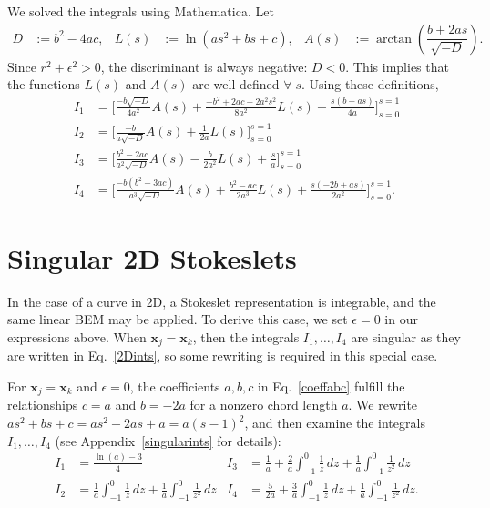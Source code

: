 \documentclass[12pt]{article}
\newcommand{\bx}{\mathbf{x}}
\newcommand{\eps}{\epsilon}
\newcommand{\baa}[1]{\begin{align} #1 \end{align}}
\newcommand{\baas}[1]{\begin{align*} #1 \end{align*}}
\begin{document}
	We solved the integrals using Mathematica. Let
	\baa{
	D & := b^2 - 4ac, & L(s) & :=  \ln \left( as^2 + bs + c \right), & A(s) & := \arctan\left(\dfrac{b + 2as}{\sqrt{-D}}\right). \nonumber
	}
	Since $r^2 + \eps^2 > 0$, the discriminant is always negative: $D < 0$. This implies that the functions $L(s)$ and $A(s)$ are well-defined $\forall \; s$. Using these definitions,
	\baa{
	I_1 & = \Bigg[\frac{-b\sqrt{-D}}{4a^2}A(s) + \frac{-b^2 + 2ac + 2a^2s^2}{8a^2}L(s) + \frac{s(b-as)}{4a} \Bigg]_{s=0}^{s=1} \nonumber \\
	I_2 & = \Bigg[\frac{-b}{a\sqrt{-D}}A(s) + \frac{1}{2a}L(s) \Bigg]_{s=0}^{s=1} \nonumber \\
	I_3 & = \Bigg[\frac{b^2 - 2ac}{a^2\sqrt{-D}}A(s) - \frac{b}{2a^2}L(s) + \frac{s}{a}\Bigg]_{s=0}^{s=1} \nonumber \\
	I_4 & = \Bigg[\frac{-b(b^2 - 3ac)}{a^3\sqrt{-D}}A(s) + \frac{b^2 - ac}{2a^3}L(s) + \frac{s(-2b +as)}{2a^2} \Bigg]_{s=0}^{s=1}. \label{2Dints}
	}
	

	\section{Singular 2D Stokeslets}
	
	In the case of a curve in 2D, a Stokeslet representation is integrable, and the same linear BEM may be applied. To derive this case, we set $\eps = 0$ in our expressions above. When $\bx_j = \bx_k$, then the integrals $I_1,\dotsc,I_4$ are singular as they are written in Eq.~\eqref{2Dints}, so some rewriting is required in this special case.
	
	For $\bx_j = \bx_k$ and $\eps = 0$, the coefficients $a,b,c$ in Eq.~\eqref{coeffabc} fulfill the relationships $c = a$ and $b = -2a$ for a nonzero chord length $a$. We rewrite $as^2 + bs + c = as^2 -2as + a = a(s-1)^2$, and then examine the integrals $I_1,\dotsc,I_4$ (see Appendix~\ref{singularints} for details):
	\baas{
	I_1 &= \frac{\ln(a) - 3}{4}  & I_3 &= \frac{1}{a} + \frac{2}{a}\int_{-1}^0 \frac{1}{z} \, dz + \frac{1}{a}\int_{-1}^0 \frac{1}{z^2} \, dz \\
	I_2 &= \frac{1}{a}\int_{-1}^0 \frac{1}{z} \, dz + \frac{1}{a}\int_{-1}^0 \frac{1}{z^2} \, dz & I_4 &= \frac{5}{2a} + \frac{3}{a}\int_{-1}^0 \frac{1}{z} \, dz + \frac{1}{a}\int_{-1}^0 \frac{1}{z^2} \, dz.
	}
	
\end{document}
